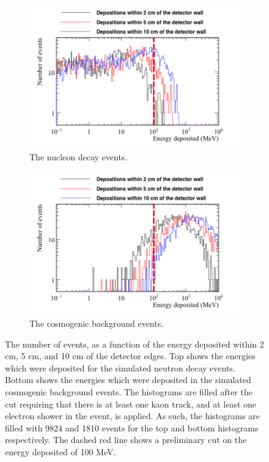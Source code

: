 \begin{figure}
  \centering
  \begin{subfigure}{0.75\textwidth}
    \centering
    \includegraphics[width=\textwidth]{NucleonDecay_EDepNearEdges}
    \caption{The nucleon decay events.}
  \end{subfigure}
  \begin{subfigure}{0.75\textwidth}
    \centering
    \includegraphics[width=\textwidth]{CosmicBackground_EDepNearEdges}
    \caption{The cosmogenic background events.}
  \end{subfigure}
  \caption[The number of events, as a function of the energy deposited within 2 cm, 5 cm, and 10 cm of the detector edges.]
          {The number of events, as a function of the energy deposited within 2 cm, 5 cm, and 10 cm of the detector edges. Top shows the energies which were deposited for the simulated neutron decay events. Bottom shows the energies which were deposited in the simulated cosmogenic background events. The histograms are filled after the cut requiring that there is at least one kaon track, and at least one electron shower in the event, is applied. As such, the histograms are filled with 9824 and 1810 events for the top and bottom histograms respectively. The dashed red line shows a preliminary cut on the energy deposited of 100 MeV.}
  \label{fig:NDK_EDepNearEdge}
\end{figure}

